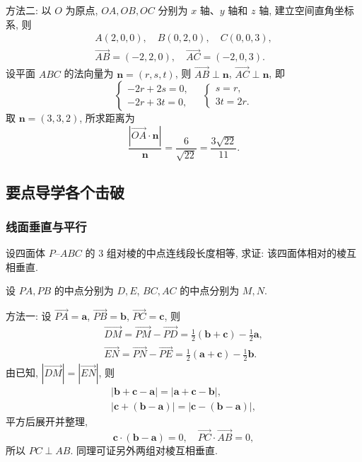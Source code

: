     方法二: 以 $O$ 为原点, $OA, OB, OC$ 分别为 $x$ 轴、$y$ 轴和 $z$ 轴, 建立空间直角坐标系, 则
    \[\begin{gathered}
        A(2,0,0),\quad B(0,2,0),\quad C(0,0,3),\\
        \overrightarrow{AB}= (-2,2,0),\quad
        \overrightarrow{AC}= (-2,0,3).
    \end{gathered}\]
    设平面 $ABC$ 的法向量为 $\bm{n}= (r,s,t)$, 则 $\overrightarrow{AB}\perp \bm{n}$, $\overrightarrow{AC}\perp \bm{n}$, 即
    \[\left\{\!\!\begin{array}{l}
        -2r+2s= 0,\\
        -2r+3t=0,
    \end{array}\right.\quad
    \left\{\!\!\begin{array}{l}
        s= r,\\
        3t= 2r.
    \end{array}\right.\]
    取 $\bm{n}= (3,3,2)$, 所求距离为
    \[\frac{|\overrightarrow{OA}\cdot \bm{n}|}{\bm{n}}
    = \frac{6}{\sqrt{22}}= \frac{3\sqrt{22}}{11}.\]
\endsolution

\subsection{要点导学\quad 各个击破}
\subsubsection{线面垂直与平行}
\begin{example}
    设四面体 $P\text{--}ABC$ 的 $3$ 组对棱的中点连线段长度相等, 求证: 该四面体相对的棱互相垂直.
\end{example}
\beginsolution
    设 $PA, PB$ 的中点分别为 $D,E$, $BC, AC$ 的中点分别为 $M,N$.

    方法一: 设 $\overrightarrow{PA}= \bm{a}$, $\overrightarrow{PB}= \bm{b}$, $\overrightarrow{PC}= \bm{c}$, 则
    \[\begin{gathered}
        \overrightarrow{DM}
        = \overrightarrow{PM}- \overrightarrow{PD}
        = \frac12(\bm{b}+ \bm{c})- \frac12\bm{a},\\
        \overrightarrow{EN}
        = \overrightarrow{PN}- \overrightarrow{PE}
        = \frac12(\bm{a}+ \bm{c})- \frac12\bm{b}.
    \end{gathered}\]
    由已知, $|\overrightarrow{DM}|= |\overrightarrow{EN}|$, 则
    \[\begin{gathered}
        |\bm{b}+ \bm{c}-\bm{a}|= |\bm{a}+ \bm{c}- \bm{b}|,\\
        |\bm{c}+ (\bm{b}-\bm{a})|= |\bm{c}- (\bm{b}-\bm{a})|,
    \end{gathered}\]
    平方后展开并整理,
    \[\bm{c}\cdot (\bm{b}-\bm{a})= 0,\quad
    \overrightarrow{PC}\cdot \overrightarrow{AB}= 0,\]
    所以 $PC\perp AB$. 同理可证另外两组对棱互相垂直.

